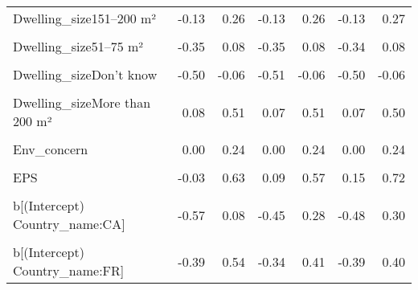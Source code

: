 \begin{table}
\begin{tabular}[t]{lrrrrrr}
Dwelling\_size151–200 m² & -0.13 & 0.26 & -0.13 & 0.26 & -0.13 & 0.27\\
\cellcolor{gray!10}{Dwelling\_size26–50 m²} & \cellcolor{gray!10}{-0.27} & \cellcolor{gray!10}{0.26} & \cellcolor{gray!10}{-0.27} & \cellcolor{gray!10}{0.27} & \cellcolor{gray!10}{-0.29} & \cellcolor{gray!10}{0.26}\\
Dwelling\_size51–75 m² & -0.35 & 0.08 & -0.35 & 0.08 & -0.34 & 0.08\\
\cellcolor{gray!10}{Dwelling\_size76–100 m²} & \cellcolor{gray!10}{-0.29} & \cellcolor{gray!10}{0.06} & \cellcolor{gray!10}{-0.30} & \cellcolor{gray!10}{0.06} & \cellcolor{gray!10}{-0.30} & \cellcolor{gray!10}{0.06}\\
Dwelling\_sizeDon't know & -0.50 & -0.06 & -0.51 & -0.06 & -0.50 & -0.06\\
\cellcolor{gray!10}{Dwelling\_sizeLess than 25 m²} & \cellcolor{gray!10}{-1.00} & \cellcolor{gray!10}{0.13} & \cellcolor{gray!10}{-0.98} & \cellcolor{gray!10}{0.11} & \cellcolor{gray!10}{-1.01} & \cellcolor{gray!10}{0.10}\\
Dwelling\_sizeMore than 200 m² & 0.08 & 0.51 & 0.07 & 0.51 & 0.07 & 0.50\\
\cellcolor{gray!10}{Rural} & \cellcolor{gray!10}{-0.04} & \cellcolor{gray!10}{0.22} & \cellcolor{gray!10}{-0.04} & \cellcolor{gray!10}{0.22} & \cellcolor{gray!10}{-0.04} & \cellcolor{gray!10}{0.22}\\
Env\_concern & 0.00 & 0.24 & 0.00 & 0.24 & 0.00 & 0.24\\
\cellcolor{gray!10}{Gov\_support} & \cellcolor{gray!10}{7.34} & \cellcolor{gray!10}{18.58} & \cellcolor{gray!10}{7.26} & \cellcolor{gray!10}{19.30} & \cellcolor{gray!10}{7.30} & \cellcolor{gray!10}{18.04}\\
EPS & -0.03 & 0.63 & 0.09 & 0.57 & 0.15 & 0.72\\
\cellcolor{gray!10}{b[(Intercept) Country\_name:BE]} & \cellcolor{gray!10}{0.19} & \cellcolor{gray!10}{0.85} & \cellcolor{gray!10}{-0.24} & \cellcolor{gray!10}{0.65} & \cellcolor{gray!10}{-0.26} & \cellcolor{gray!10}{0.63}\\
b[(Intercept) Country\_name:CA] & -0.57 & 0.08 & -0.45 & 0.28 & -0.48 & 0.30\\
\cellcolor{gray!10}{b[(Intercept) Country\_name:CH]} & \cellcolor{gray!10}{-0.43} & \cellcolor{gray!10}{0.40} & \cellcolor{gray!10}{-0.39} & \cellcolor{gray!10}{0.38} & \cellcolor{gray!10}{-0.42} & \cellcolor{gray!10}{0.37}\\
b[(Intercept) Country\_name:FR] & -0.39 & 0.54 & -0.34 & 0.41 & -0.39 & 0.40\\

\end{tabular}
\end{table}
